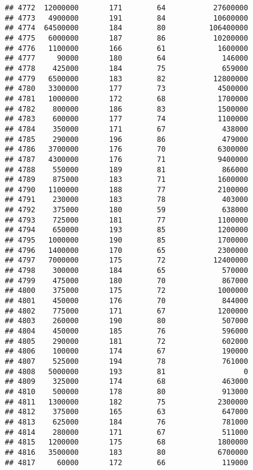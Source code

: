 \documentclass[
]{article}
\begin{document}
\begin{verbatim}
## 4772  12000000       171        64           27600000
## 4773   4900000       191        84           10600000
## 4774  64500000       184        80          106400000
## 4775   6000000       187        86           10200000
## 4776   1100000       166        61            1600000
## 4777     90000       180        64             146000
## 4778    425000       184        75             659000
## 4779   6500000       183        82           12800000
## 4780   3300000       177        73            4500000
## 4781   1000000       172        68            1700000
## 4782    800000       186        83            1500000
## 4783    600000       177        74            1100000
## 4784    350000       171        67             438000
## 4785    290000       196        86             479000
## 4786   3700000       176        70            6300000
## 4787   4300000       176        71            9400000
## 4788    550000       189        81             866000
## 4789    875000       183        71            1600000
## 4790   1100000       188        77            2100000
## 4791    230000       183        78             403000
## 4792    375000       180        59             638000
## 4793    725000       181        77            1100000
## 4794    650000       193        85            1200000
## 4795   1000000       190        85            1700000
## 4796   1400000       170        65            2300000
## 4797   7000000       175        72           12400000
## 4798    300000       184        65             570000
## 4799    475000       180        70             867000
## 4800    375000       175        72            1000000
## 4801    450000       176        70             844000
## 4802    775000       171        67            1200000
## 4803    260000       190        80             507000
## 4804    450000       185        76             596000
## 4805    290000       181        72             602000
## 4806    100000       174        67             190000
## 4807    525000       194        78             761000
## 4808   5000000       193        81                  0
## 4809    325000       174        68             463000
## 4810    500000       178        80             913000
## 4811   1300000       182        75            2300000
## 4812    375000       165        63             647000
## 4813    625000       184        76             781000
## 4814    280000       171        67             511000
## 4815   1200000       175        68            1800000
## 4816   3500000       183        80            6700000
## 4817     60000       172        66             119000

\end{verbatim}
\end{document}
